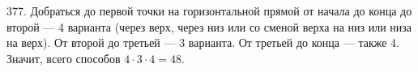 377. Добраться до первой точки на горизонтальной прямой от начала до конца до второй --- 4 варианта (через верх, через низ или со сменой верха на низ или низа на верх). От второй до третьей --- 3 варианта. От третьей до конца --- также 4. Значит, всего способов $4\cdot3\cdot4=48.$\\
